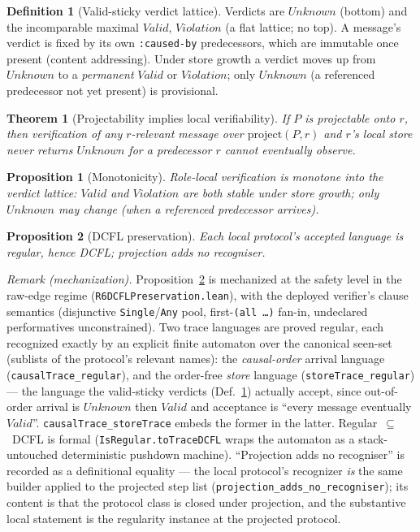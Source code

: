 \documentclass[11pt]{article}
\newcommand{\code}[1]{\texttt{#1}}
\newcommand{\caused}{\code{:caused-by}}
\theoremstyle{definition}
\newtheorem{definition}{Definition}
\theoremstyle{plain}
\newtheorem{theorem}{Theorem}
\newtheorem{proposition}{Proposition}
\begin{document}
\begin{definition}[Valid-sticky verdict lattice]
\label{lat:lattice}
Verdicts are $\mathit{Unknown}$ (bottom) and the incomparable maximal $\mathit{Valid}$,
$\mathit{Violation}$ (a flat lattice; no top).
A message's verdict is fixed by its own \caused{} predecessors, which are immutable once
present (content addressing).
Under store growth a verdict moves up from $\mathit{Unknown}$ to a \emph{permanent}
$\mathit{Valid}$ or $\mathit{Violation}$; only $\mathit{Unknown}$ (a referenced
predecessor not yet present) is provisional.
\end{definition}

\begin{theorem}[Projectability implies local verifiability]
\label{thm:equiv}
If $P$ is projectable onto $r$, then verification of any $r$-relevant message over
$\mathrm{project}(P,r)$ and $r$'s local store never returns $\mathit{Unknown}$ for a
predecessor $r$ cannot eventually observe.
\end{theorem}

\begin{proposition}[Monotonicity]
\label{prop:mono}
Role-local verification is monotone into the verdict lattice: $\mathit{Valid}$ and
$\mathit{Violation}$ are both stable under store growth; only $\mathit{Unknown}$ may
change (when a referenced predecessor arrives).
\end{proposition}

\begin{proposition}[DCFL preservation]
\label{prop:dcfl}
Each local protocol's accepted language is regular, hence DCFL; projection adds no
recogniser.
\end{proposition}

\noindent\emph{Remark (mechanization).}
Proposition~\ref{prop:dcfl} is mechanized at the safety level in the raw-edge regime
(\code{R6DCFLPreservation.lean}), with the deployed verifier's clause semantics
(disjunctive \code{Single}/\code{Any} pool, first-\code{(all \ldots)} fan-in,
undeclared performatives unconstrained). Two trace languages are proved regular, each
recognized exactly by an explicit finite automaton over the canonical seen-set
(sublists of the protocol's relevant names): the \emph{causal-order} arrival language
(\code{causalTrace\_regular}), and the order-free \emph{store} language
(\code{storeTrace\_regular}) — the language the valid-sticky verdicts
(Def.~\ref{lat:lattice}) actually accept, since out-of-order arrival is
$\mathit{Unknown}$ then $\mathit{Valid}$ and acceptance is ``every message eventually
$\mathit{Valid}$''. \code{causalTrace\_storeTrace} embeds the former in the latter.
Regular~$\subseteq$~DCFL is formal (\code{IsRegular.toTraceDCFL} wraps the automaton as
a stack-untouched deterministic pushdown machine). ``Projection adds no recogniser'' is
recorded as a definitional equality — the local protocol's recognizer \emph{is} the
same builder applied to the projected step list
(\code{projection\_adds\_no\_recogniser}); its content is that the protocol class is
closed under projection, and the substantive local statement is the regularity
instance at the projected protocol.
\end{document}
